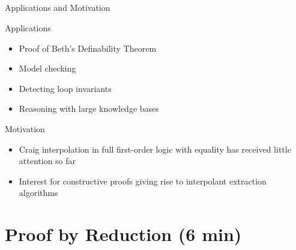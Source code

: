 \documentclass[final,compress]{beamer}
\begin{document}
\subsection{}
\begin{frame}{Applications and Motivation}
	\begin{block}{Applications}
		\begin{itemize}
			\item Proof of Beth's Definability Theorem
			\item Model checking
			\item Detecting loop invariants
			\item Reasoning with large knowledge bases
		\end{itemize}
	\end{block}
	\pause
	\begin{block}{Motivation}
		\begin{itemize}
			\item Craig interpolation in full first-order logic with equality has received little attention so far
			\item Interest for constructive proofs giving rise to interpolant extraction algorithms
		\end{itemize}
	\end{block}

\end{frame}



\section{Proof by Reduction (6 min)}
\end{document}
